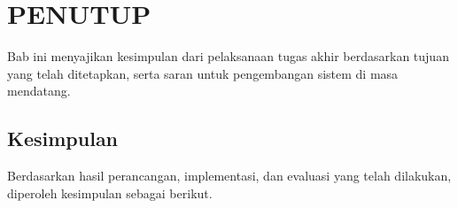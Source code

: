 \cleardoublepage
\chapter{PENUTUP}
\label{chap:penutup}

Bab ini menyajikan kesimpulan dari pelaksanaan tugas akhir berdasarkan tujuan yang telah ditetapkan, serta saran untuk pengembangan sistem di masa mendatang.

\section{Kesimpulan}

Berdasarkan hasil perancangan, implementasi, dan evaluasi yang telah dilakukan, diperoleh kesimpulan sebagai berikut.

